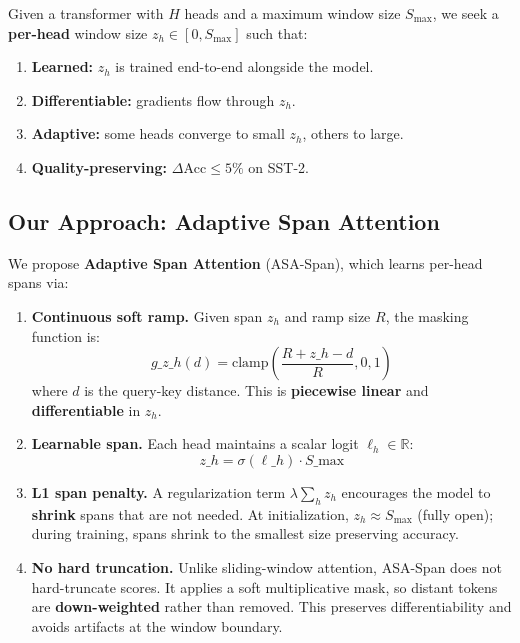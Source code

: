 Given a transformer with $H$ heads and a maximum window size $S_\text{max}$, 
we seek a \textbf{per-head} window size $z_h \in [0, S_\text{max}]$ such that:

\begin{enumerate}
\item \textbf{Learned:} $z_h$ is trained end-to-end alongside the model.
\item \textbf{Differentiable:} gradients flow through $z_h$.
\item \textbf{Adaptive:} some heads converge to small $z_h$, others to large.
\item \textbf{Quality-preserving:} $\Delta\text{Acc} \leq 5\%$ on SST-2.

\end{enumerate}
\subsection{Our Approach: Adaptive Span Attention}

We propose \textbf{Adaptive Span Attention} (ASA-Span), which learns per-head 
spans via:

\begin{enumerate}
\item \textbf{Continuous soft ramp.} Given span $z_h$ and ramp size $R$, the masking
  function is:
  \[
g\_{z\_h}(d) = \text{clamp}\!\left(\frac{R + z\_h - d}{R}, 0, 1\right)
\]
  where $d$ is the query-key distance. This is \textbf{piecewise linear} and
  \textbf{differentiable} in $z_h$.

\item \textbf{Learnable span.} Each head maintains a scalar logit $\ell_h \in \mathbb{R}$:
  \[
z\_h = \sigma(\ell\_h) \cdot S\_\text{max}
\]

\item \textbf{L1 span penalty.} A regularization term $\lambda \sum_h z_h$ encourages
  the model to \textbf{shrink} spans that are not needed. At initialization,
  $z_h \approx S_\text{max}$ (fully open); during training, spans shrink
  to the smallest size preserving accuracy.

\item \textbf{No hard truncation.} Unlike sliding-window attention, ASA-Span does not
  hard-truncate scores. It applies a soft multiplicative mask, so distant
  tokens are \textbf{down-weighted} rather than removed. This preserves
  differentiability and avoids artifacts at the window boundary.

\end{enumerate}
